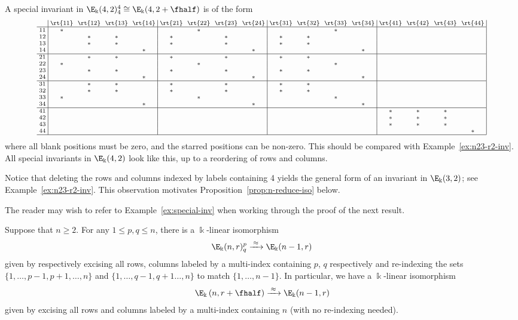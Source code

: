 \begin{exam}\label{ex:special-inv}
A special invariant in $\E_\Bbbk(4,2)^4_4 \cong \E_\Bbbk(4,2+\fhalf)$
is of the form
\[
\text{\setlength{\arraycolsep}{2.7pt}\scriptsize
$\displaystyle \begin{array}{c|cccc|cccc|cccc|cccc|}
 &\rt{11}&\rt{12}&\rt{13}&\rt{14}&\rt{21}&\rt{22}&\rt{23}&\rt{24}&
 \rt{31}&\rt{32}&\rt{33}&\rt{34}&\rt{41}&\rt{42}&\rt{43}&\rt{44}\\ \hline
 11&*& & & & &*& & & & &*& & & & & \\ 12& &*&*& &*& &*& &*&*& & & & &
 & \\ 13& &*&*& &*& &*& &*&*& & & & & & \\ 14& & & &*& & & &*& & &
 &*& & & & \\ \hline 21& &*&*& &*& &*& &*&*& & & & & & \\ 22&*& & & &
 &*& & & & &*& & & & & \\ 23& &*&*& &*& &*& &*&*& & & & & & \\ 24& &
 & &*& & & &*& & & &*& & & & \\ \hline 31& &*&*& &*& &*& &*&*& & & &
 & & \\ 32& &*&*& &*& &*& &*&*& & & & & & \\ 33&*& & & & &*& & & &
 &*& & & & & \\ 34& & & &*& & & &*& & & &*& & & & \\ \hline 41& & & &
 & & & & & & & & &*&*&*& \\ 42& & & & & & & & & & & & &*&*&*& \\ 43&
 & & & & & & & & & & & &*&*&*& \\ 44& & & & & & & & & & & & & & &
 &*\\ \hline
\end{array}$}
\]
where all blank positions must be zero, and the starred positions can
be non-zero. This should be compared with Example~\ref{ex:n23-r2-inv}.
All special invariants in $\E_\Bbbk(4,2)$ look like this, up to a
reordering of rows and columns.

Notice that deleting the rows and columns indexed by labels containing
4 yields the general form of an invariant in $\E_\Bbbk(3,2)$; see
Example~\ref{ex:n23-r2-inv}. This observation motivates Proposition~\ref{prop:n-reduce-iso} below.
\end{exam}

The reader may wish to refer to Example~\ref{ex:special-inv} when
working through the proof of the next result.

\begin{prop}\label{prop:n-reduce-iso}
Suppose that $n \ge 2$. For any $1 \le p,q \le n$, there is a
$\Bbbk$-linear isomorphism
\[
\E_\Bbbk(n,r)^p_q \xrightarrow{\;\approx\;} \E_\Bbbk(n-1,r)
\]
given by respectively excising all rows, columns labeled by a
multi-index containing $p$, $q$ respectively and re-indexing the sets
$\{1, \dots, p-1, p+1, \dots, n\}$ and $\{1, \dots, q-1, q+1 \dots,
n\}$ to match $\{1, \dots, n-1\}$. In particular, we have a
$\Bbbk$-linear isomorphism
\[
\E_\Bbbk\left(n,r+\fhalf\right) \xrightarrow{\;\approx\;} \E_\Bbbk(n-1,r)
\]
given by excising all rows and columns labeled by a multi-index
containing $n$ (with no re-indexing needed).
\end{prop}

